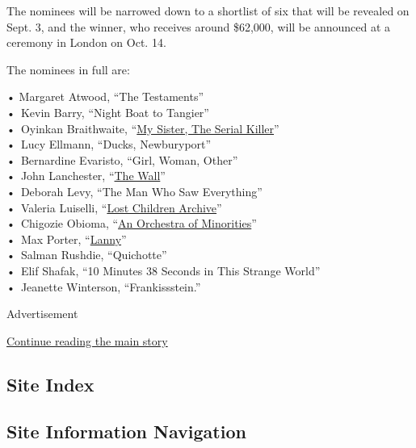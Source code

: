 The nominees will be narrowed down to a shortlist of six that will be
revealed on Sept. 3, and the winner, who receives around \$62,000, will
be announced at a ceremony in London on Oct. 14.

The nominees in full are:

• Margaret Atwood, ``The Testaments''\\
•~Kevin Barry, ``Night Boat to Tangier''\\
•~Oyinkan Braithwaite,
``\href{https://www.nytimes3xbfgragh.onion/2019/01/09/books/review/oyinkan-braithwaite-my-sister-the-serial-killer.html?searchResultPosition=2}{My
Sister, The Serial Killer}''\\
•~Lucy Ellmann, ``Ducks, Newburyport''\\
•~Bernardine Evaristo, ``Girl, Woman, Other''\\
•~John Lanchester,
``\href{https://www.nytimes3xbfgragh.onion/2019/03/05/books/review/john-lanchester-wall.html}{The
Wall}''\\
•~Deborah Levy, ``The Man Who Saw Everything''\\
•~Valeria Luiselli,
``\href{https://www.nytimes3xbfgragh.onion/2019/03/06/books/review/lost-children-archive-valeria-luiselli.html}{Lost
Children Archive}''\\
•~Chigozie Obioma,
``\href{https://www.nytimes3xbfgragh.onion/2019/01/21/books/review/chigozie-obioma-orchestra-minorities.html}{An
Orchestra of Minorities}''\\
•~Max Porter,
``\href{https://www.nytimes3xbfgragh.onion/2019/06/25/books/review/max-porter-lanny.html}{Lanny}''\\
•~Salman Rushdie, ``Quichotte''\\
•~Elif Shafak, ``10 Minutes 38 Seconds in This Strange World''\\
•~Jeanette Winterson, ``Frankissstein.''

Advertisement

\protect\hyperlink{after-bottom}{Continue reading the main story}

\hypertarget{site-index}{%
\subsection{Site Index}\label{site-index}}

\hypertarget{site-information-navigation}{%
\subsection{Site Information
Navigation}\label{site-information-navigation}}

